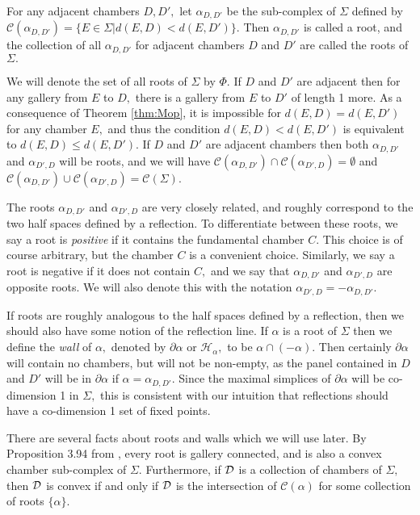 \documentclass[class=book, crop=false,12 pt]{standalone}
\begin{document}
\begin{defn}
	\label{defn:root}
	For any adjacent chambers $D,D',$ let $\alpha_{D,D'}$ be the sub-complex of $\Sigma$ defined by $\mathcal{C}(\alpha_{D,D'})=\{E\in \Sigma|d(E,D)<d(E,D')\}.$ Then $\alpha_{D,D'}$ is called a root, and the collection of all $\alpha_{D,D'}$ for adjacent chambers $D$ and $D'$ are called the roots of $\Sigma.$
\end{defn}

We will denote the set of all roots of $\Sigma$ by $\Phi.$ If $D$ and $D'$ are adjacent then for any gallery from $E$ to $D,$ there is a gallery from $E$ to $D'$ of length 1 more. As a consequence of Theorem \ref{thm:Mop}, it is impossible for $d(E,D)=d(E,D')$ for any chamber $E,$ and thus the condition $d(E,D)<d(E,D')$ is equivalent to $d(E,D)\le d(E,D').$ If $D$ and $D'$ are adjacent chambers then both $\alpha_{D,D'}$ and $\alpha_{D',D}$ will be roots, and we will have $\mathcal{C}(\alpha_{D,D'})\cap \mathcal{C}(\alpha_{D',D})=\emptyset$ and $\mathcal{C}(\alpha_{D,D'})\cup \mathcal{C}(\alpha_{D',D})=\mathcal{C}(\Sigma).$

The roots $\alpha_{D,D'}$ and $\alpha_{D',D}$ are very closely related, and roughly correspond to the two half spaces defined by a reflection. To differentiate between these roots, we say a root is \emph{positive} if it contains the fundamental chamber $C.$ This choice is of course arbitrary, but the chamber $C$ is a convenient choice. Similarly, we say a root is negative if it does not contain $C,$ and we say that $\alpha_{D,D'}$ and $\alpha_{D',D}$ are opposite roots. We will also denote this with the notation $\alpha_{D',D}=-\alpha_{D,D'}.$

If roots are roughly analogous to the half spaces defined by a reflection, then we should also have some notion of the reflection line. If $\alpha$ is a root of $\Sigma$ then we define the \emph{wall} of $\alpha,$ denoted by $\partial\alpha$ or $\mathcal{H}_\alpha,$ to be $\alpha\cap (-\alpha).$ Then certainly $\partial \alpha$ will contain no chambers, but will not be non-empty, as the panel contained in $D$ and $D'$ will be in $\partial\alpha$ if $\alpha=\alpha_{D,D'}.$ Since the maximal simplices of $\partial\alpha$ will be co-dimension 1 in $\Sigma,$ this is consistent with our intuition that reflections should have a co-dimension 1 set of fixed points.

There are several facts about roots and walls which we will use later. By Proposition 3.94 from \cite{buildings}, every root is gallery connected, and is also a convex chamber sub-complex of $\Sigma.$ Furthermore, if $\mathcal{D}$ is a collection of chambers of $\Sigma,$ then $\mathcal{D}$ is convex if and only if $\mathcal{D}$ is the intersection of $\mathcal{C}(\alpha)$ for some collection of roots $\{\alpha\}.$ 
\end{document}
